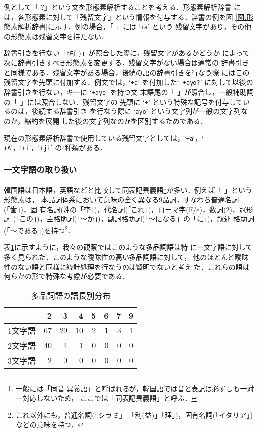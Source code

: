 例として「
?」という文を形態素解析することを考える．形態素解析辞書
には，各形態素に対して「残留文字」という情報を付与する．辞書の例を図
\ref{図:形態素解析辞書}に示す．例の場合，「
」には `{\tt +a}' という
残留文字があり，その他の形態素は残留文字を持たない．

辞書引きを行ない「{\tt hE}(
)」が照合した際に，残留文字があるかどうか
によって次に辞書引きすべき形態素を変更する．残留文字がない場合は通常の
辞書引きと同様である．残留文字がある場合，後続の語の辞書引きを行なう際
にはこの残留文字を先頭に付加する．例文では，`{\tt +a}' を付加した`{\tt
  +ayo?}' に対して以後の辞書引きを行ない，キーに `{\tt +ayo}' を持つ文
末語尾の「
」が照合し，一般補助詞の「
」には照合しない．残留文字の
先頭に `{\tt +}' という特殊な記号を付与しているのは，後続する辞書引き
を行なう際に `{\tt ayo}' という文字列が一般の文字列なのか，縮約を展開
した後の文字列なのかを区別するためである．

現在の形態素解析辞書で使用している残留文字としては，`{\tt +a}'，`{\tt
  +A}'，`{\tt +i}'，`{\tt +ji}' の4種類がある．

\subsubsection{一文字語の取り扱い}

韓国語は日本語，英語などと比較して同表記異義語\footnote{一般には「同音
異義語」と呼ばれるが，韓国語では音と表記は必ずしも一対一対応しないため，
ここでは「同表記異義語」と呼ぶ．}が多い．例えば「
」という形態素は，
本品詞体系において意味の全く異なる9品詞，すなわち普通名詞(「歯」)，固
有名詞(姓の「李」)，代名詞(「これ」)，ローマ字(E/e)，数詞(2)，冠形詞
(「この」)，主格助詞(「〜が」)，副詞格助詞(「〜になる」の「に」)，叙述
格助詞(「〜である」)を持つ{}\footnote {これ以外にも，普通名詞(「シラミ」
「利(益)」「理」)，固有名詞(「イタリア」)などの意味を持つ．}．

表\ref{表:多品詞語}に示すように，我々の観察ではこのような多品詞語は特
に一文字語に対して多く見られた．このような曖昧性の高い多品詞語に対して，
他のほとんど曖昧性のない語と同様に統計処理を行なうのは賢明でないと考え
た．これらの語は何らかの形で特殊な考慮が必要である．

\begin{table}
\begin{center}
\caption{多品詞語の語長別分布}
\label{表:多品詞語}
\begin{tabular}{l|rrrrrrr}
\hline\hline
        &  2 & 3  &  4 & 5 & 6 & 7 & 9 \\
\hline
1文字語 & 67 & 29 & 10 & 2 & 1 & 3 & 1 \\
2文字語 & 40 &  4 &  1 & 0 & 0 & 0 & 0 \\
3文字語 &  2 &  0 &  0 & 0 & 0 & 0 & 0 \\
\hline
\end{tabular}
\end{center}
\end{table}

